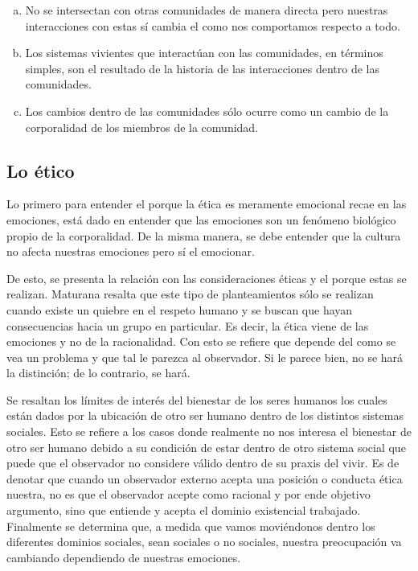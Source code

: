 \documentclass[10pt]{article}
\begin{document}
        \begin{enumerate}[a)]
            
            \item No se intersectan con otras comunidades de manera directa pero nuestras interacciones con estas sí cambia el como nos comportamos respecto a todo.
            
            \item Los sistemas vivientes que interactúan con las comunidades, en términos simples, son el resultado de la historia de las interacciones dentro de las comunidades.
            
            \item Los cambios dentro de las comunidades sólo ocurre como un cambio de la corporalidad de los miembros de la comunidad.
        \end{enumerate}

        \subsection{Lo ético}
        
        Lo primero para entender el porque la ética es meramente emocional recae en las emociones, está dado en entender que las emociones son un fenómeno biológico propio de la corporalidad. De la misma manera, se debe entender que la cultura no afecta nuestras emociones pero sí el emocionar.
        
        De esto, se presenta la relación con las consideraciones éticas y el porque estas se realizan. Maturana resalta que este tipo de planteamientos sólo se realizan cuando existe un quiebre en el respeto humano y se buscan que hayan consecuencias hacia un grupo en particular. Es decir, la ética viene de las emociones y no de la racionalidad. Con esto se refiere que depende del como se vea un problema y que tal le parezca al observador. Si le parece bien, no se hará la distinción; de lo contrario, se hará.

        Se resaltan los límites de interés del bienestar de los seres humanos los cuales están dados por la ubicación de otro ser humano dentro de los distintos sistemas sociales. Esto se refiere a los casos donde realmente no nos interesa el bienestar de otro ser humano debido a su condición de estar dentro de otro sistema social que puede que el observador no considere válido dentro de su praxis del vivir. Es de denotar que cuando un observador externo acepta una posición o conducta ética nuestra, no es que el observador acepte como racional y por ende objetivo argumento, sino que entiende y acepta el dominio existencial trabajado. Finalmente se determina que, a medida que vamos moviéndonos dentro los diferentes dominios sociales, sean sociales o no sociales, nuestra preocupación va cambiando dependiendo de nuestras emociones.
        
\end{document}
